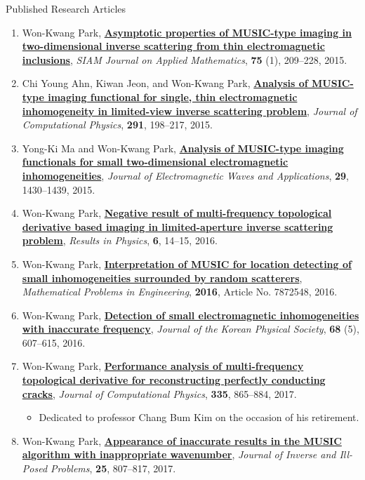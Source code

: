 \documentclass{resume} %
\begin{document}
\begin{rSection}{Published Research Articles}
\begin{enumerate}
\item\label{A-SIAP2015} Won-Kwang Park, \href{http://dx.doi.org/10.1137/140975176}{\textbf{Asymptotic properties of MUSIC-type imaging in two-dimensional inverse scattering from thin electromagnetic inclusions}}, \textit{SIAM Journal on Applied Mathematics}, \textbf{75} (1), 209--228, 2015.
\item\label{A-JCOMP2015B} Chi Young Ahn, Kiwan Jeon, and Won-Kwang Park, \href{http://dx.doi.org/10.1016/j.jcp.2015.03.018}{\textbf{Analysis of MUSIC-type imaging functional for single, thin electromagnetic inhomogeneity in limited-view inverse scattering problem}}, \textit{Journal of Computational Physics}, \textbf{291}, 198--217, 2015.
\item\label{A-JEMWA2015} Yong-Ki Ma and Won-Kwang Park, \href{http://dx.doi.org/10.1080/09205071.2015.1047468}{\textbf{Analysis of MUSIC-type imaging functionals for small two-dimensional electromagnetic inhomogeneities}}, \textit{Journal of Electromagnetic Waves and Applications}, \textbf{29}, 1430--1439, 2015.
\item\label{A-RINP2016} Won-Kwang Park, \href{http://dx.doi.org/10.1016/j.rinp.2015.11.007}{\textbf{Negative result of multi-frequency topological derivative based imaging in limited-aperture inverse scattering problem}}, \textit{Results in Physics}, \textbf{6}, 14--15, 2016.
\item\label{A-MPE2016} Won-Kwang Park, \href{http://dx.doi.org/10.1155/2016/7872548}{\textbf{Interpretation of MUSIC for location detecting of small inhomogeneities surrounded by random scatterers}}, \textit{Mathematical Problems in Engineering}, \textbf{2016}, Article No. 7872548, 2016.
\item\label{A-JKPS2016} Won-Kwang Park, \href{http://dx.doi.org/10.3938/jkps.68.607}{\textbf{Detection of small electromagnetic inhomogeneities with inaccurate frequency}}, \textit{Journal of the Korean Physical Society}, \textbf{68} (5), 607--615, 2016.
\item\label{A-JCOMP2017A} Won-Kwang Park, \href{http://dx.doi.org/10.1016/j.jcp.2017.02.007}{\textbf{Performance analysis of multi-frequency topological derivative for reconstructing perfectly conducting cracks}}, \textit{Journal of Computational Physics}, \textbf{335}, 865--884, 2017.
    \begin{itemize}
      \item Dedicated to professor Chang Bum Kim on the occasion of his retirement.
    \end{itemize}
\item\label{A-JIILP2017} Won-Kwang Park, \href{http://dx.doi.org/10.1515/jiip-2016-0030}{\textbf{Appearance of inaccurate results in the MUSIC algorithm with inappropriate wavenumber}}, \textit{Journal of Inverse and Ill-Posed Problems}, \textbf{25}, 807--817, 2017.

\end{enumerate}
\end{rSection}
\end{document}

